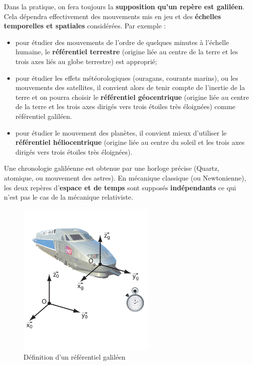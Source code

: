 \documentclass[10pt,fleqn]{article} %
\begin{document}
\begin{rem}
Dans la pratique, on fera toujours la \textbf{supposition qu'un repère est galiléen}. Cela dépendra effectivement des mouvements mis en jeu et des\textbf{ échelles temporelles et spatiales} considérées. 
Par exemple :
\begin{itemize}
\item pour étudier des mouvements de l'ordre de quelques minutes à l'échelle humaine, le \textbf{référentiel terrestre} (origine liée au centre de la terre et les trois axes liés au globe terrestre) est approprié;
\item pour étudier les effets météorologiques (ouragans, courants marins), ou les mouvements des satellites, il convient alors de tenir compte de l'inertie de la terre et on pourra choisir le \textbf{référentiel géocentrique} (origine liée au centre de la terre et les trois axes dirigés vers trois étoiles très éloignées) comme référentiel galiléen.
\item pour étudier le mouvement des planètes, il convient mieux d'utiliser le \textbf{référentiel héliocentrique} (origine liée au centre du soleil et les trois axes dirigés vers trois étoiles très éloignées).
\end{itemize}

Une chronologie galiléenne est obtenue par une horloge précise (Quartz, atomique, ou mouvement des astres).
En mécanique classique (ou Newtonienne), les deux repères d'\textbf{espace et de temps} sont supposés \textbf{indépendants} ce qui n'est pas le cas de la mécanique relativiste. 
\end{rem}

\begin{figure}[ht!]
\begin{center}
\includegraphics[width=0.6\textwidth]{images/base_galileenne.pdf}
\end{center}
\caption{Définition d'un référentiel galiléen \label{fig:ref_galileen}}
\end{figure}
\end{document}
